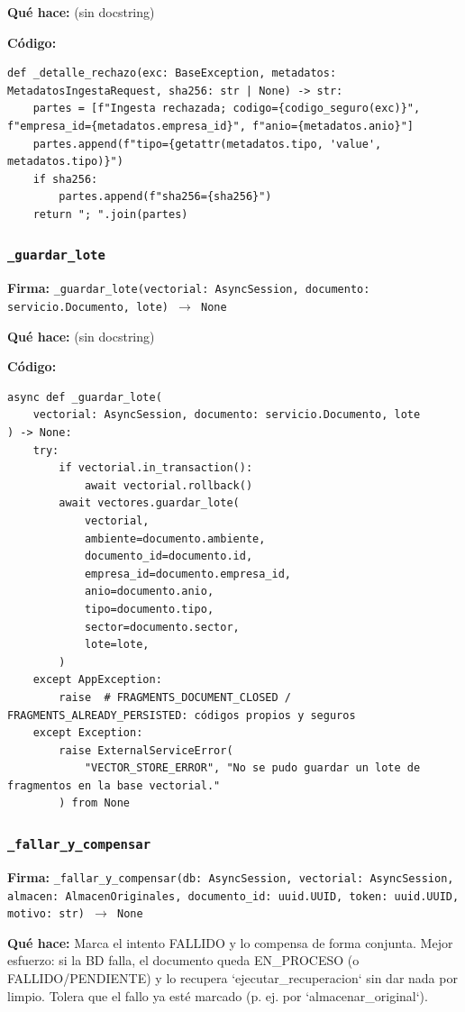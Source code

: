 \documentclass[11pt,a4paper]{article}
\begin{document}
\textbf{Qué hace:} (sin docstring)

\textbf{Código:}
\begin{lstlisting}
def _detalle_rechazo(exc: BaseException, metadatos: MetadatosIngestaRequest, sha256: str | None) -> str:
    partes = [f"Ingesta rechazada; codigo={codigo_seguro(exc)}", f"empresa_id={metadatos.empresa_id}", f"anio={metadatos.anio}"]
    partes.append(f"tipo={getattr(metadatos.tipo, 'value', metadatos.tipo)}")
    if sha256:
        partes.append(f"sha256={sha256}")
    return "; ".join(partes)
\end{lstlisting}

\subsubsection*{\texttt{\_guardar\_lote}}
\textbf{Firma:} \texttt{\_guardar\_lote(vectorial: AsyncSession, documento: servicio.Documento, lote) $\rightarrow$ None}

\textbf{Qué hace:} (sin docstring)

\textbf{Código:}
\begin{lstlisting}
async def _guardar_lote(
    vectorial: AsyncSession, documento: servicio.Documento, lote
) -> None:
    try:
        if vectorial.in_transaction():
            await vectorial.rollback()
        await vectores.guardar_lote(
            vectorial,
            ambiente=documento.ambiente,
            documento_id=documento.id,
            empresa_id=documento.empresa_id,
            anio=documento.anio,
            tipo=documento.tipo,
            sector=documento.sector,
            lote=lote,
        )
    except AppException:
        raise  # FRAGMENTS_DOCUMENT_CLOSED / FRAGMENTS_ALREADY_PERSISTED: códigos propios y seguros
    except Exception:
        raise ExternalServiceError(
            "VECTOR_STORE_ERROR", "No se pudo guardar un lote de fragmentos en la base vectorial."
        ) from None
\end{lstlisting}

\subsubsection*{\texttt{\_fallar\_y\_compensar}}
\textbf{Firma:} \texttt{\_fallar\_y\_compensar(db: AsyncSession, vectorial: AsyncSession, almacen: AlmacenOriginales, documento\_id: uuid.UUID, token: uuid.UUID, motivo: str) $\rightarrow$ None}

\textbf{Qué hace:} Marca el intento FALLIDO y lo compensa de forma conjunta. Mejor esfuerzo: si la BD falla, el documento
queda EN\_PROCESO (o FALLIDO/PENDIENTE) y lo recupera `ejecutar\_recuperacion` sin dar nada por limpio.
Tolera que el fallo ya esté marcado (p. ej. por `almacenar\_original`).
\end{document}
